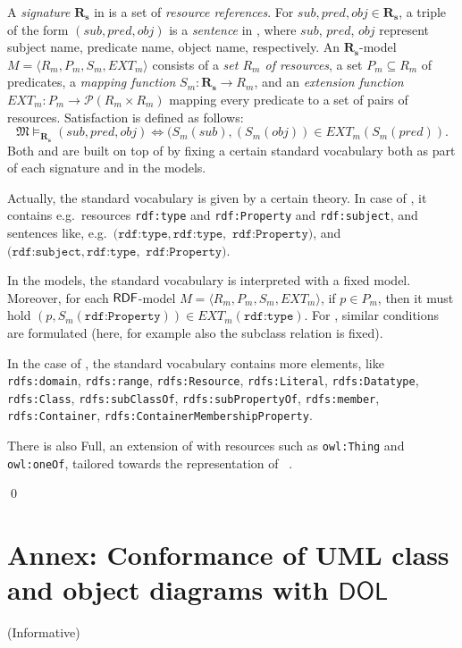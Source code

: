 \documentclass[10pt,fleqn,final]{scrreprt}
\newcommand*{\DOL}{\ensuremath{\mathsf{DOL}}\xspace}
\newcommand{\informative}[0]{{\begin{center}{\Large{(Informative})}\end{center}} \bigskip}
\newcommand{\infannex}[1]{ \chapter{Annex: #1}  \informative }
\newenvironment{definitions}[0]{\medskip }{}
\begin{document}
\begin{definitions}
\begin{definition}
A \textit{signature} $\mathbf{R_s}$ in \SimpleRDF is a set of
\textit{resource references}. For $sub, pred, obj \in \mathbf{R_s}$, a
triple of the form $(sub, pred, obj)$ is a \textit{sentence} in \SimpleRDF,
where $sub$, $pred$, $obj$ represent subject name, predicate name,
object name, respectively. An $\mathbf{R_s}$-model $M =
\langle R_m, P_m, S_m, EXT_m \rangle$ consists of a \textit{set $R_m$
  of resources}, a set $P_m \subseteq R_m$ of predicates, a
\textit{mapping function} $S_m:\mathbf{R_s} \rightarrow R_m$, and an
\textit{extension function} $EXT_m: P_m \rightarrow \mathcal{P}(R_m
\times R_m)$ mapping every predicate to a set of pairs of
resources. Satisfaction is defined as follows:
%
\[\mathfrak{M} \models_{\mathbf{R_s}} (sub, pred, obj) \Leftrightarrow (S_{m}(sub),
(S_{m}(obj)) \in EXT_{m} (S_m(pred)). \]
%
Both \RDF and \RDFS are built on top of \SimpleRDF by fixing a certain
standard vocabulary both as part of each signature and in the models.

Actually, the standard vocabulary is given by a certain theory. In case
of \RDF, it contains e.g.\ resources \texttt{rdf:type} and
\texttt{rdf:Property} and \texttt{rdf:subject}, and sentences like, e.g.\
$(\texttt{rdf:type},\texttt{rdf:type},$ $ \texttt{rdf:Property})$, and $(\texttt{rdf:subject}, \texttt{rdf:type},$  $\texttt{rdf:Property})$.

In the models, the standard vocabulary is interpreted with a fixed
model.  Moreover, for each $\mathsf{RDF}$-model $M = \langle R_m, P_m, S_m,
EXT_m \rangle$, if $p\in P_m$, then it must hold
$(p,S_m(\texttt{rdf:Property}))\in EXT_m(\texttt{rdf:type})$.
For \RDFS, similar conditions are formulated (here, for example also
the subclass relation is fixed).


In the case of \RDFS, the standard vocabulary contains more elements,
like
\texttt{rdfs:domain},
\texttt{rdfs:range}, \texttt{rdfs:Resource}, \texttt{rdfs:Literal}, \texttt{rdfs:Datatype}, \texttt{rdfs:Class},
\texttt{rdfs:subClassOf}, \texttt{rdfs:subPropertyOf}, \texttt{rdfs:member}, \texttt{rdfs:Container},
\texttt{rdfs:ContainerMembershipProperty}.

There is also \OWL Full, an extension of \RDFS with resources
such as \texttt{owl:Thing} and \texttt{owl:oneOf}, tailored towards the representation of
\OWL~\cite{W3C:REC-owl2-rdf-based-semantics-20091027}.

\qed\end{definition}


\infannex{Conformance of UML class and object diagrams with \DOL}\label{a:uml-class}


\end{definitions}
\end{document}

